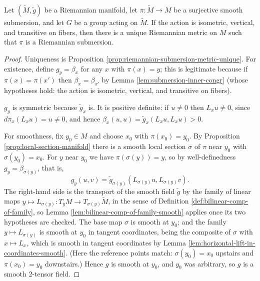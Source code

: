 \begin{theorem}
\label{thm:group-action-riemannian-submersion}
\leanok
{}
Let $(\tilde{M}, \tilde{g})$ be a Riemannian manifold, let $\pi: \tilde{M} \to M$ be a surjective smooth submersion, and let $G$ be a group acting on $\tilde{M}$. If the action is isometric, vertical, and transitive on fibers, then there is a unique Riemannian metric on $M$ such that $\pi$ is a Riemannian submersion.
\end{theorem}

\begin{proof}
\leanok
{}
Uniqueness is Proposition \ref{prop:riemannian-submersion-metric-unique}. For existence, define $g_y = \beta_x$ for any $x$ with $\pi(x) = y$; this is legitimate because if $\pi(x) = \pi(x')$ then $\beta_x = \beta_{x'}$ by Lemma \ref{lem:submersion-inner-congr} (whose hypotheses hold: the action is isometric, vertical, and transitive on fibers).

$g_y$ is symmetric because $\tilde{g}_x$ is. It is positive definite: if $u \neq 0$ then $L_x u \neq 0$, since $d\pi_x(L_x u) = u \neq 0$, and hence $\beta_x(u,u) = \tilde{g}_x(L_x u, L_x u) > 0$.

For smoothness, fix $y_0 \in M$ and choose $x_0$ with $\pi(x_0) = y_0$. By Proposition \ref{prop:local-section-manifold} there is a smooth local section $\sigma$ of $\pi$ near $y_0$ with $\sigma(y_0) = x_0$. For $y$ near $y_0$ we have $\pi(\sigma(y)) = y$, so by well-definedness $g_y = \beta_{\sigma(y)}$, that is,
\[
g_y(u,v) = \tilde{g}_{\sigma(y)}(L_{\sigma(y)} u, L_{\sigma(y)} v).
\]
The right-hand side is the transport of the smooth field $\tilde{g}$ by the family of linear maps $y \mapsto L_{\sigma(y)} : T_yM \to T_{\sigma(y)}\tilde{M}$, in the sense of Definition \ref{def:bilinear-comp-of-family}, so Lemma \ref{lem:bilinear-comp-of-family-smooth} applies once its two hypotheses are checked. The base map $\sigma$ is smooth at $y_0$; and the family $y \mapsto L_{\sigma(y)}$ is smooth at $y_0$ in tangent coordinates, being the composite of $\sigma$ with $x \mapsto L_x$, which is smooth in tangent coordinates by Lemma \ref{lem:horizontal-lift-in-coordinates-smooth}. (Here the reference points match: $\sigma(y_0) = x_0$ upstairs and $\pi(x_0) = y_0$ downstairs.) Hence $g$ is smooth at $y_0$, and $y_0$ was arbitrary, so $g$ is a smooth $2$-tensor field.


\end{proof}
